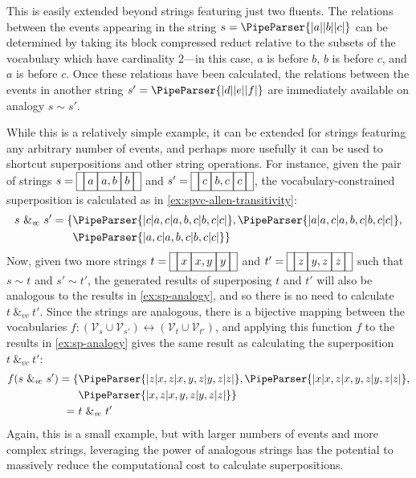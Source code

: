 \documentclass[a4paper,12pt,leqno]{article}
\newcommand{\vph}[1]{\vphantom{#1}}
\newcommand{\ebox}[1]{\fbox{$\vph{'(),}#1$}}
\newcommand{\nbOverlaps}[2]{\ebox{#1}\ebox{#1,#2}\ebox{#2}}
\newcommand{\nbDuring}[2]{\ebox{#2}\ebox{#1,#2}\ebox{#2}}
\newcommand{\Overlaps}[2]{\ebox{}\nbOverlaps{#1}{#2}\ebox{}}
\newcommand{\During}[2]{\ebox{}\nbDuring{#1}{#2}\ebox{}}
\newcommand{\spvc}{~\&_{v\!c}~}
\newcommand{\V}{\mathcal{V}}
\newcommand{\EventString}[1]{%
	\renewcommand*{\do}[1]{\ebox{##1}}%
	\PipeParser{#1}%
}
\begin{document}
This is easily extended beyond strings featuring just two fluents. The relations between the events appearing in the string $s = \EventString{{}|a|{}|b|{}|c|{}}$ can be determined by taking its block compressed reduct relative to the subsets of the vocabulary which have cardinality 2---in this case, $a$ is before $b$, $b$ is before $c$, and $a$ is before $c$. Once these relations have been calculated, the relations between the events in another string $s' = \EventString{{}|d|{}|e|{}|f|{}}$ are immediately available on analogy $s \sim s'$.

While this is a relatively simple example, it can be extended for strings featuring any arbitrary number of events, and perhaps more usefully it can be used to shortcut superpositions and other string operations. For instance, given the pair of strings $s = \Overlaps{a}{b}$ and $s' = \During{b}{c}$, the vocabulary-constrained superposition is calculated as in \cref{ex:spvc-allen-transitivity}:
\begin{align}\label{ex:sp-analogy}
	s \spvc s' = \{&\EventString{{}|c|a,c|a,b,c|b,c|c|{}}, \EventString{{}|a|a,c|a,b,c|b,c|c|{}},\\
	&\EventString{{}|a,c|a,b,c|b,c|c|{}}\}\notag
\end{align}
Now, given two more strings $t = \Overlaps{x}{y}$ and $t' = \During{y}{z}$ such that $s \sim t$ and $s' \sim t'$, the generated results of superposing $t$ and $t'$ will also be analogous to the results in \cref{ex:sp-analogy}, and so there is no need to calculate $t \spvc t'$. Since the strings are analogous, there is a bijective mapping between the vocabularies $f: (\V_{s} \cup \V_{s'}) \leftrightarrow (\V_{t} \cup \V_{t'})$, and applying this function $f$ to the results in \cref{ex:sp-analogy} gives the same result as calculating the superposition $t \spvc t'$:
\begin{align}\label{ex:sp-analogy-equal}
	f(s \spvc s') = \{&\EventString{{}|z|x,z|x,y,z|y,z|z|{}}, \EventString{{}|x|x,z|x,y,z|y,z|z|{}},\\
	&\EventString{{}|x,z|x,y,z|y,z|z|{}}\}\notag\\
	=~&t \spvc t'
\end{align}
Again, this is a small example, but with larger numbers of events and more complex strings, leveraging the power of analogous strings has the potential to massively reduce the computational cost to calculate superpositions.
\end{document}
